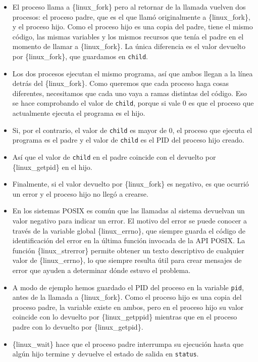 \begin{itemize}
\item
  El proceso llama a \{linux\_fork\} pero al retornar de la llamada
  vuelven dos procesos: el proceso padre, que es el que llamó
  originalmente a \{linux\_fork\}, y el proceso hijo. Como el proceso
  hijo es una copia del padre, tiene el mismo código, las mismas
  variables y los mismos recursos que tenía el padre en el momento de
  llamar a \{linux\_fork\}. La única diferencia es el valor devuelto por
  \{linux\_fork\}, que guardamos en \texttt{child}.
\item
  Los dos procesos ejecutan el mismo programa, así que ambos llegan a la
  línea detrás del \{linux\_fork\}. Como queremos que cada proceso haga
  cosas diferentes, necesitamos que cada uno vaya a ramas distintas del
  código. Eso se hace comprobando el valor de \texttt{child}, porque si
  vale 0 es que el proceso que actualmente ejecuta el programa es el
  hijo.
\item
  Si, por el contrario, el valor de \texttt{child} es mayor de 0, el
  proceso que ejecuta el programa es el padre y el valor de
  \texttt{child} es el PID del proceso hijo creado.
\item
  Así que el valor de \texttt{child} en el padre coincide con el
  devuelto por \{linux\_getpid\} en el hijo.
\item
  Finalmente, si el valor devuelto por \{linux\_fork\} es negativo, es
  que ocurrió un error y el proceso hijo no llegó a crearse.
\item
  En los sistemas POSIX es común que las llamadas al sistema devuelvan
  un valor negativo para indicar un error. El motivo del error se puede
  conocer a través de la variable global \{linux\_errno\}, que siempre
  guarda el código de identificación del error en la última función
  invocada de la API POSIX. La función \{linux\_strerror\} permite
  obtener un texto descriptivo de cualquier valor de \{linux\_errno\},
  lo que siempre resulta útil para crear mensajes de error que ayuden a
  determinar dónde estuvo el problema.
\item
  A modo de ejemplo hemos guardado el PID del proceso en la variable
  \texttt{pid}, antes de la llamada a \{linux\_fork\}. Como el proceso
  hijo es una copia del proceso padre, la variable existe en ambos, pero
  en el proceso hijo su valor coincide con lo devuelto por
  \{linux\_getppid\} mientras que en el proceso padre con lo devuelto
  por \{linux\_getpid\}.
\item
  \{linux\_wait\} hace que el proceso padre interrumpa su ejecución
  hasta que algún hijo termine y devuelve el estado de salida en
  \texttt{status}.


\end{itemize}
